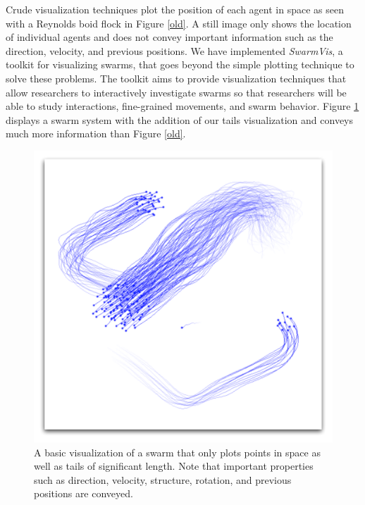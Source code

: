 \documentclass[conference]{IEEEtran}
\begin{document}
Crude visualization techniques plot the position of each agent in space as seen with a Reynolds boid flock\cite{reynolds1987} in Figure \ref{old}. A still image only shows the location of individual agents and does not convey important information such as the direction, velocity, and previous positions.
We have implemented \textit{SwarmVis}, a toolkit for visualizing swarms, that goes beyond the simple plotting technique to solve these problems. The toolkit aims to provide visualization techniques that allow researchers to interactively investigate swarms so that researchers will be able to study interactions, fine-grained movements, and swarm behavior. Figure \ref{ShowOff} displays a swarm system with
the addition of our tails visualization and conveys much more information than Figure \ref{old}.

\begin{figure}[ht]
\centering
\includegraphics[scale=.42]{images/showoff.pdf}
\caption{A basic visualization of a swarm that only plots points in space as well as tails of significant length.
Note that important properties such as direction, velocity, structure, rotation,
and previous positions are conveyed.}
\label{ShowOff}
\end{figure}
\end{document}

